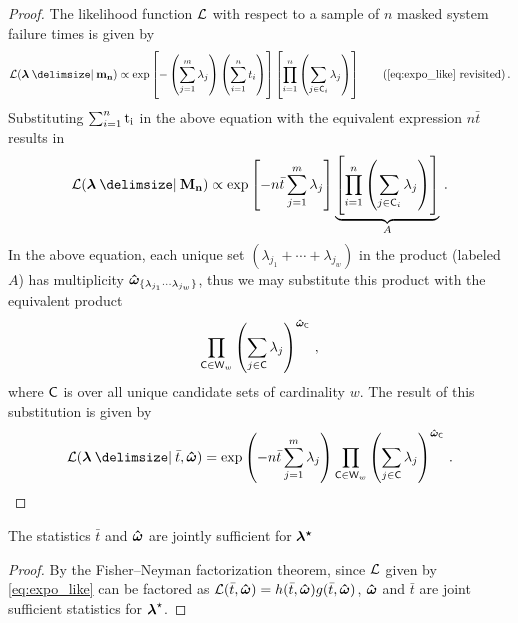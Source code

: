\documentclass[
    11pt,
    extrafontsizes,
    article,
    oldfontcommands,
    final,
    oneside,
    openany,
    hidelinks]{memoir}
\begin{document}
\begin{proof}
The likelihood function $\operatorname{\mathcal{L}}$ with respect to a sample of $n$ masked system failure times is given by
\begin{equation*}
\likelihood(\vec\lambda \Given \mfso) \propto
    \exp \left [ - \left ( \sum_{j=1}^{m} \lambda_j \right ) \left ( \sum_{i=1}^{n} t_i \right ) \right ]
    \left [ \prod_{i=1}^{n} \left ( \sum_{j \in \cand_i} \lambda_j \right ) \right ]\tag{\ref{eq:expo_like} revisited}\,.
\end{equation*}
Substituting $\sum_{i=1}^{n} \rm{t}_i$ in the above equation with the equivalent expression $n \bar{t}$ results in
\begin{equation}
\likelihood(\vec\lambda \Given \mfs) \propto
    \exp \left [ - n \bar{t} \sum_{j=1}^{m} \lambda_j \right ]
    \underbrace{
        \left [ \prod_{i=1}^{n} \left ( \sum_{j \in \cand_i} \lambda_j \right ) \right ]
    }_{A}\,.
\end{equation}
In the above equation, each unique set $\left(\lambda_{j_1} + \cdots + \lambda_{j_w}\right)$ in the product (labeled $A$) has multiplicity $\boldsymbol{\hat\omega}_{\{\lambda_{j_1} \cdots \lambda_{j_w}\}}$, thus we may substitute this product with the equivalent product
\begin{equation}
    \prod_{\cand \in \candsw{w}} \left ( \sum_{j \in \cand} \lambda_j \right )^{\cntsymb_{\cand}}\,,
\end{equation}
where $\cand$ is over all unique candidate sets of cardinality $w$. The result of this substitution is given by
\begin{equation}
\likelihood(\vec\lambda \Given \bar{t}, \cntsymb) =
    \exp \left ( -n \bar{t} \sum_{j=1}^{m} \lambda_j \right )
    \prod_{\cand \in \candsw{w}} \left ( \sum_{j \in \cand} \lambda_j \right )^{\cntsymb_{\cand}}\,.
\end{equation}
\end{proof}

The statistics $\bar{t}$ and $\boldsymbol{\hat\omega}$ are jointly sufficient for $\boldsymbol{\mathbf{{\lambda}^{\star}}}$
\begin{proof}
By the Fisher–Neyman factorization theorem, since $\operatorname{\mathcal{L}}$ given by \cref{eq:expo_like} can be factored as $\operatorname{\mathcal{L}}(\bar{t}, \boldsymbol{\hat\omega}) = h(\bar{t}, \boldsymbol{\hat\omega}) g(\bar{t}, \boldsymbol{\hat\omega})$, $\boldsymbol{\hat\omega}$ and $\bar t$ are joint sufficient statistics for ${\boldsymbol{\mathbf{\lambda}}}^{\star}$.
\end{proof}
\end{document}
